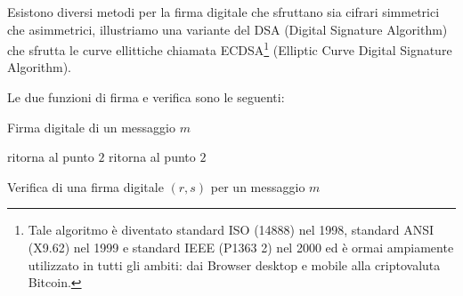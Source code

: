 \documentclass{article}
\begin{document}
	Esistono diversi metodi per la firma digitale che sfruttano sia cifrari simmetrici che asimmetrici, illustriamo una variante del DSA (Digital Signature Algorithm) che sfrutta le curve ellittiche chiamata ECDSA\footnote{Tale algoritmo è diventato standard ISO (14888) nel 1998, standard ANSI (X9.62) nel 1999 e standard IEEE (P1363 2) nel 2000 ed è ormai ampiamente utilizzato in tutti gli ambiti: dai Browser desktop e mobile alla criptovaluta Bitcoin.} (Elliptic Curve Digital Signature Algorithm).\\
	
	\clearpage
	
	Le due funzioni di firma e verifica sono le seguenti:
	
	\begin{algorithm}[H]
		\caption{Firma digitale di un messaggio $m$ }
		\begin{algorithmic}[1]
			\Statex
			ritorna al punto $2$
			\EndIf
			ritorna al punto $2$
			\EndIf
			\State {}
			\EndFunction
		\end{algorithmic}
	\end{algorithm}
	
	\begin{algorithm}[H]
		\caption{Verifica di una firma digitale $(r, s)$ per un messaggio $m$ }
		\begin{algorithmic}[1]
			\Statex
				\State {}
			\EndIf
			\State {}
			\EndIf
			\State {}
			\EndIf	
			\State {}
			\EndFunction
		\end{algorithmic}
	\end{algorithm}
	
\end{document}
